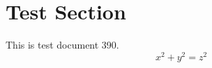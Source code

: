 \documentclass{article}
\begin{document}
\section{Test Section}
This is test document 390.
\begin{equation}
x^2 + y^2 = z^2
\end{equation}
\end{document}
